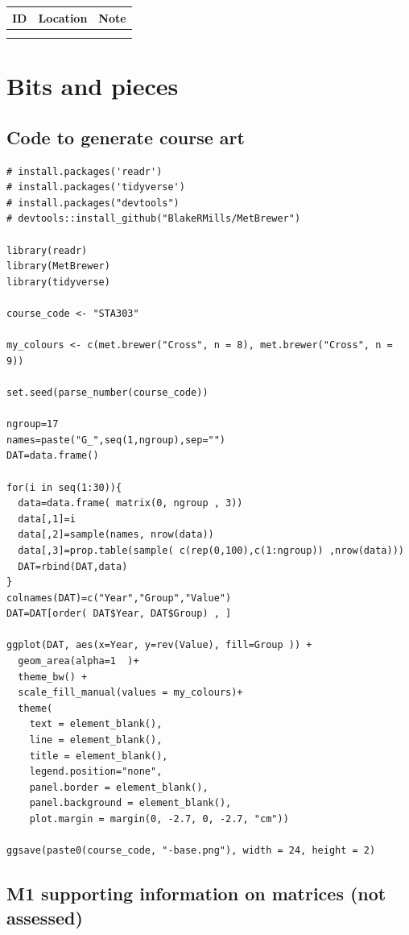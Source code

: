 \documentclass[
  openany]{book}
\begin{document}
\begin{longtable}[]{@{}lll@{}}
\toprule
ID & Location & Note \\
\midrule
\endhead
& & \\
& & \\
\bottomrule
\end{longtable}

\hypertarget{bits-and-pieces}{%
\chapter{Bits and pieces}\label{bits-and-pieces}}

\hypertarget{code-to-generate-course-art}{%
\section{Code to generate course art}\label{code-to-generate-course-art}}

\begin{verbatim}
# install.packages('readr')
# install.packages('tidyverse')
# install.packages("devtools")
# devtools::install_github("BlakeRMills/MetBrewer")

library(readr)
library(MetBrewer)
library(tidyverse)

course_code <- "STA303"

my_colours <- c(met.brewer("Cross", n = 8), met.brewer("Cross", n = 9))

set.seed(parse_number(course_code))

ngroup=17
names=paste("G_",seq(1,ngroup),sep="")
DAT=data.frame()

for(i in seq(1:30)){
  data=data.frame( matrix(0, ngroup , 3))
  data[,1]=i
  data[,2]=sample(names, nrow(data))
  data[,3]=prop.table(sample( c(rep(0,100),c(1:ngroup)) ,nrow(data)))
  DAT=rbind(DAT,data)
}
colnames(DAT)=c("Year","Group","Value")
DAT=DAT[order( DAT$Year, DAT$Group) , ]

ggplot(DAT, aes(x=Year, y=rev(Value), fill=Group )) +
  geom_area(alpha=1  )+
  theme_bw() +
  scale_fill_manual(values = my_colours)+
  theme(
    text = element_blank(),
    line = element_blank(),
    title = element_blank(),
    legend.position="none",
    panel.border = element_blank(),
    panel.background = element_blank(),
    plot.margin = margin(0, -2.7, 0, -2.7, "cm"))

ggsave(paste0(course_code, "-base.png"), width = 24, height = 2)
\end{verbatim}

\hypertarget{matrices}{%
\section{M1 supporting information on matrices (not assessed)}\label{matrices}}
\end{document}
